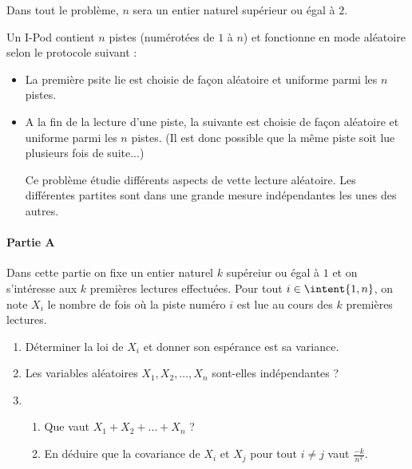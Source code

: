 




\begin{probleme}
Dans tout le problème, $n$ sera un entier naturel supérieur ou égal à $2$. 

Un I-Pod contient $n$ pistes (numérotées de $1$ à $n$) et fonctionne en mode aléatoire  selon le protocole suivant : 

\begin{itemize}
\item La première psite lie est choisie de façon aléatoire et uniforme parmi les $n$ pistes. 
\item A la fin de la lecture d'une piste, la suivante est choisie de façon aléatoire et uniforme parmi les $n$ pistes. (Il est donc possible que la même piste soit lue plusieurs fois de suite...) 

Ce problème étudie différents aspects de vette lecture aléatoire. Les différentes partites sont dans une grande mesure indépendantes les unes des autres. 
\end{itemize}


\paragraph{Partie A}
\noindent

Dans cette partie on fixe un entier naturel $k$ supéreiur ou égal à $1$ et on s'intéresse aux $k$ premières lectures effectuées. Pour tout $i\in \intent{1, n}$, on note $X_i$ le nombre de fois où la piste numéro $i$ est lue au cours des $k$ premières lectures. 

\begin{enumerate}
\item Déterminer la loi de $X_i$ et donner son espérance est sa variance. 


\item Les variables aléatoires $X_1, X_2, \dots , X_n $ sont-elles indépendantes ? 


\item \begin{enumerate}
\item Que vaut $X_1 +X_2 +\dots +X_n $ ? 


\item En déduire que la covariance de $X_i$ et $X_j $ pour tout $i\neq j$ vaut $\frac{-k}{n^2}.$



\end{enumerate}
\end{enumerate}
\end{probleme}
